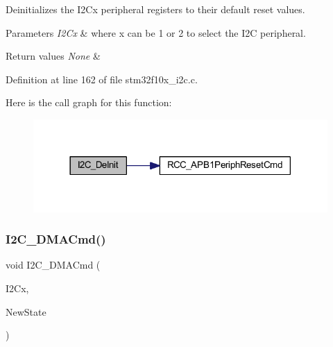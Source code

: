 Deinitializes the I2\+Cx peripheral registers to their default reset values. 


\begin{DoxyParams}{Parameters}
{\em I2\+Cx} & where x can be 1 or 2 to select the I2C peripheral. \\
\hline
\end{DoxyParams}

\begin{DoxyRetVals}{Return values}
{\em None} & \\
\hline
\end{DoxyRetVals}


Definition at line 162 of file stm32f10x\+\_\+i2c.\+c.

Here is the call graph for this function\+:
\nopagebreak
\begin{figure}[H]
\begin{center}
\leavevmode
\includegraphics[width=318pt]{group___i2_c___private___functions_ga2ee214364603059ad5d9089f749f5bfd_cgraph}
\end{center}
\end{figure}
\mbox{\label{group___i2_c___private___functions_ga38502ce11e5ec923e0f6476aaa35b45c}} 
\subsubsection{\texorpdfstring{I2\+C\+\_\+\+D\+M\+A\+Cmd()}{I2C\_DMACmd()}}
{\footnotesize\ttfamily void I2\+C\+\_\+\+D\+M\+A\+Cmd (\begin{DoxyParamCaption}\item[{\hyperlink{struct_i2_c___type_def}{I2\+C\+\_\+\+Type\+Def} $\ast$}]{I2\+Cx,  }\item[{\hyperlink{group___exported__types_gac9a7e9a35d2513ec15c3b537aaa4fba1}{Functional\+State}}]{New\+State }\end{DoxyParamCaption})}




